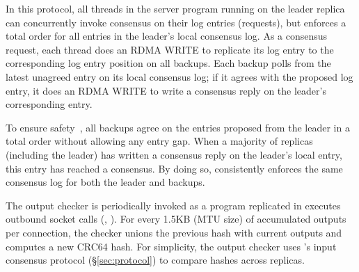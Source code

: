 In this protocol, all threads in the server program running on the leader 
replica can concurrently invoke consensus on their log entries (requests), but 
\xxx enforces a total order for all entries in the leader's local consensus 
log. As a consensus request, each thread does an RDMA WRITE to replicate its 
log entry to the corresponding log entry position on all \xxx backups. Each 
\xxx backup polls from the latest unagreed entry on its local consensus log; 
if it agrees with the proposed log entry, it does an RDMA WRITE to write a 
consensus reply on the leader's corresponding entry.

To ensure \paxos safety~\cite{paxos:practical}, all \xxx backups agree on the 
entries proposed from the leader in a total order without allowing any entry 
gap. When a majority of replicas (including the leader) has written a consensus 
reply on the leader's local entry, this entry has reached a consensus. By doing 
so, \xxx consistently enforces the same consensus log for both the leader and
backups.

The output checker is periodically invoked as a program replicated in \xxx 
executes outbound socket calls (\eg, \send). For every 1.5KB (MTU size) of 
accumulated outputs per connection, the checker unions the previous hash with 
current outputs and computes a new CRC64 hash. For simplicity, the output 
checker uses \xxx's input consensus protocol (\S\ref{sec:protocol}) to compare 
hashes across replicas.
